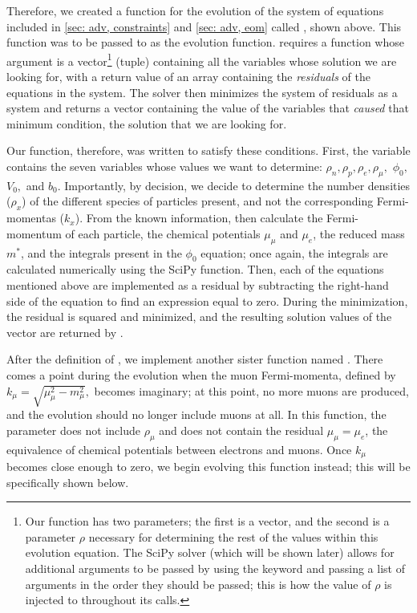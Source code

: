 Therefore, we created a function for the evolution of the system of equations included in \autoref{sec: adv, constraints} and \autoref{sec: adv, eom} called , shown above. This function was to be passed to  as the evolution function.  requires a function whose argument is a vector\footnote{Our function has two parameters; the first is a vector, and the second is a parameter $\rho$ necessary for determining the rest of the values within this evolution equation. The SciPy solver (which will be shown later) allows for additional arguments to be passed by using the  keyword and passing a list of arguments in the order they should be passed; this is how the value of $\rho$ is injected to  throughout its calls.} (tuple) containing all the variables whose solution we are looking for, with a return value of an array containing the \textit{residuals} of the equations in the system. The solver then minimizes the system of residuals as a system and returns a vector containing the value of the variables that \textit{caused} that minimum condition, the solution that we are looking for.

Our  function, therefore, was written to satisfy these conditions. First, the variable  contains the seven variables whose values we want to determine: $\rho_n, \rho_p, \rho_e, \rho_\mu,$ $\phi_0,$  $V_0,$ and $b_0$. Importantly, by decision, we decide to determine the number densities ($\rho_x$) of the different species of particles present, and not the corresponding Fermi-momentas ($k_x$). From the known information, then calculate the Fermi-momentum of each particle, the chemical potentials $\mu_\mu$ and $\mu_e$, the reduced mass $m^*$, and the integrals present in the $\phi_0$ equation; once again, the integrals are calculated numerically using the SciPy  function. Then, each of the equations mentioned above are implemented as a residual by subtracting the right-hand side of the equation to find an expression equal to zero. During the minimization, the residual is squared and minimized, and the resulting solution values of the vector are returned by .

After the definition of , we implement another sister function named  . There comes a point during the evolution when the muon Fermi-momenta, defined by $k_\mu = \sqrt{\mu_\mu^2 - m_\mu^2},$ becomes imaginary; at this point, no more muons are produced, and the evolution should no longer include muons at all. In this function, the parameter  does not include $\rho_\mu$ and does not contain the residual $\mu_\mu = \mu_e$, the equivalence of chemical potentials between electrons and muons. Once $k_\mu$ becomes close enough to zero, we begin evolving this function instead; this will be specifically shown below.


